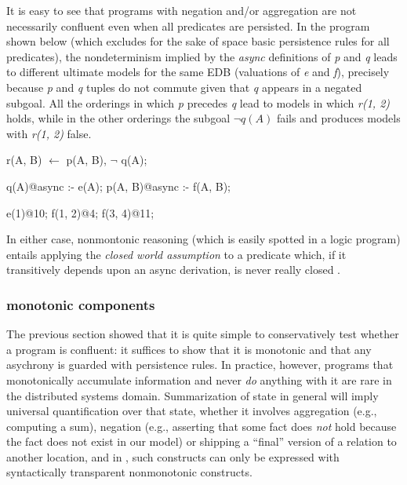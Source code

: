 It is easy to see that programs with negation and/or aggregation are not necessarily confluent even when all
predicates are persisted.  In the program shown below (which excludes for the sake of space 
basic persistence rules for all predicates), the nondeterminism implied by the {\em async}
definitions of {\em p} and {\em q} leads to different ultimate models for the same EDB
(valuations of {\em e} and {\em f}), precisely because {\em p} and {\em q} tuples do not
commute given that {\em q} appears in a negated subgoal.  All the orderings in which {\em p}
precedes {\em q} lead to models in which {\em r(1, 2)} holds, while in the other orderings the subgoal
$\lnot q(A)$ fails and produces models with {\em r(1, 2)} false.

\begin{Dedalus}
r(A, B) \(\leftarrow\) 
    p(A, B), \(\lnot\) q(A);

q(A)@async :- e(A);
p(A, B)@async :- f(A, B);

e(1)@10;
f(1, 2)@4;
f(3, 4)@11; 
\end{Dedalus} 

In either case, nonmontonic  reasoning (which is easily spotted in a logic program)
entails applying the \emph{closed world assumption}  to a predicate which, if it transitively 
depends upon an async derivation, is never really closed .

\subsubsection{monotonic components}


The previous section showed that it is quite simple to conservatively test whether a program
is confluent: it suffices to show that it is monotonic and that any asychrony is guarded with
persistence rules.
In practice, however, programs that monotonically accumulate information and never \emph{do} 
anything with it are rare in the distributed systems domain.  Summarization of state in 
general will imply universal quantification over that state, whether it involves aggregation (e.g., computing a sum), negation (e.g., asserting that some fact does \emph{not} hold because 
the fact does not exist in our model) or shipping a ``final'' version of a relation to another 
location, and in \lang, such constructs can only be expressed with syntactically transparent
nonmonotonic constructs.  

